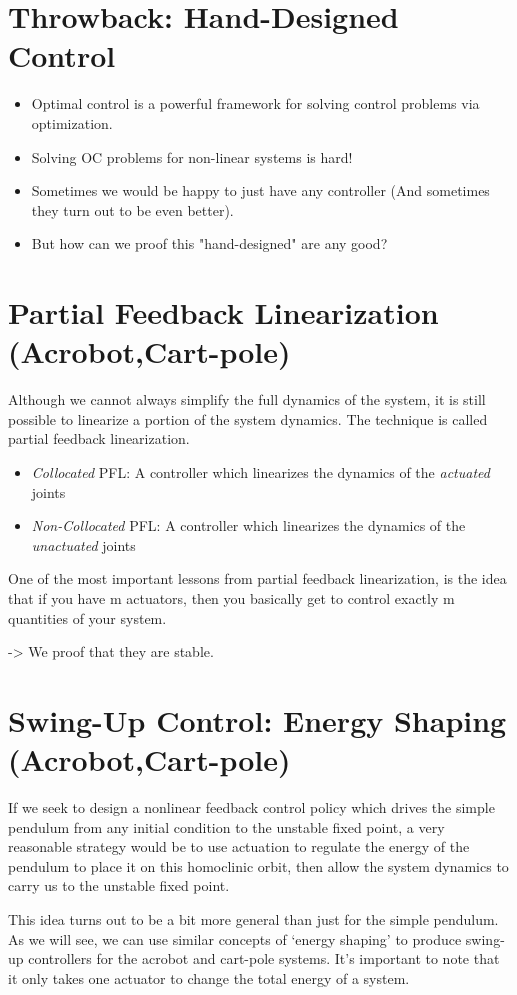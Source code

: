 \section{Throwback: Hand-Designed Control}
\begin{itemize}
\item Optimal control is a powerful framework for solving control problems via optimization.
\item Solving OC problems for non-linear systems is hard!
\item Sometimes we would be happy to just have any controller (And sometimes they turn out to be even better).
\item But how can we proof this "hand-designed" are any good? 
\end{itemize}

\section{Partial Feedback Linearization (Acrobot,Cart-pole)}
Although we cannot always simplify the full dynamics of the system, it is still possible to linearize a portion of the system dynamics. The technique is called partial feedback linearization.
\begin{itemize}
\item \textit{Collocated} PFL: A controller which linearizes the dynamics of the \textit{actuated} joints
\item \textit{Non-Collocated} PFL: A controller which linearizes the dynamics of the \textit{unactuated} joints
\end{itemize}
One of the most important lessons from partial feedback linearization, is the idea that if you have m actuators, then you basically get to control exactly m quantities of your system.

-> We proof that they are stable. 

\section{Swing-Up Control: Energy Shaping (Acrobot,Cart-pole)}
If we seek to design a nonlinear feedback control policy which drives the simple pendulum from any initial condition to the unstable fixed point, a very reasonable strategy would be to use actuation to regulate the energy of the pendulum to place it on this homoclinic orbit, then allow the system dynamics to carry us to the unstable fixed point.

This idea turns out to be a bit more general than just for the simple pendulum. As we will see, we can use similar concepts of `energy shaping' to produce swing-up controllers for the acrobot and cart-pole systems. It's important to note that it only takes one actuator to change the total energy of a system.


